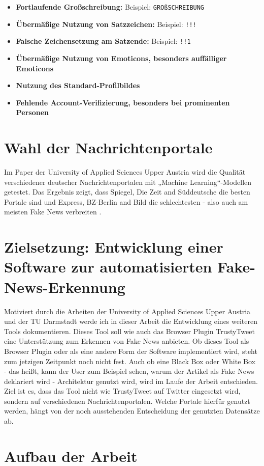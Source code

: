 \begin{itemize}
    \item \textbf{Fortlaufende Großschreibung:} Beispiel: \texttt{GROßSCHREIBUNG}
    
    \item \textbf{Übermäßige Nutzung von Satzzeichen:} Beispiel: \texttt{!!!}
    
    \item \textbf{Falsche Zeichensetzung am Satzende:} Beispiel: \texttt{!!1}
    
    \item \textbf{Übermäßige Nutzung von Emoticons, besonders auffälliger Emoticons}
    
    \item \textbf{Nutzung des Standard-Profilbildes}
    
    \item \textbf{Fehlende Account-Verifizierung, besonders bei prominenten Personen}
\end{itemize}

\section{Wahl der Nachrichtenportale}
\label{sec:wahl_nachrichtenportale}

Im Paper der University of Applied Sciences Upper Austria wird die Qualität verschiedener deutscher Nachrichtenportalen mit „Machine Learning“-Modellen getestet. 
Das Ergebnis zeigt, dass Spiegel, Die Zeit and Süddeutsche die besten Portale sind und Express, BZ-Berlin and Bild die schlechtesten - also auch am meisten Fake News verbreiten \cite{Simone2022}.

\section{Zielsetzung: Entwicklung einer Software zur automatisierten Fake-News-Erkennung}
\label{sec:zielsetzung}

Motiviert durch die Arbeiten der University of Applied Sciences Upper Austria und der TU Darmstadt werde ich in dieser Arbeit die Entwicklung eines weiteren Tools dokumentieren.
Dieses Tool soll wie auch das Browser Plugin TrustyTweet eine Unterstützung zum Erkennen von Fake News anbieten.
Ob dieses Tool als Browser Plugin oder als eine andere Form der Software implementiert wird, steht zum jetzigen Zeitpunkt noch nicht fest.
Auch ob eine Black Box oder White Box - das heißt, kann der User zum Beispiel sehen, warum der Artikel als Fake News deklariert wird - Architektur genutzt wird, wird im Laufe der Arbeit entschieden.
Ziel ist es, dass das Tool nicht wie TrustyTweet auf Twitter eingesetzt wird, sondern auf verschiedenen Nachrichtenportalen.
Welche Portale hierfür genutzt werden, hängt von der noch ausstehenden Entscheidung der genutzten Datensätze ab. %

\section{Aufbau der Arbeit}
\label{sec:aufbau}

